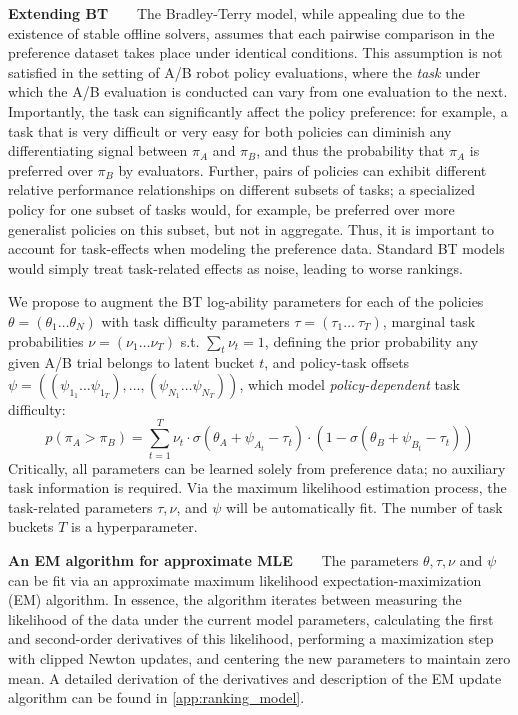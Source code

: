 \textbf{Extending BT~~~} The Bradley-Terry model, while appealing due to the existence of stable offline solvers, assumes that each pairwise comparison in the preference dataset takes place under identical conditions. This assumption is not satisfied in the setting of A/B robot policy evaluations, where the \emph{task} under which the A/B evaluation is conducted can vary from one evaluation to the next. Importantly, the task can significantly affect the policy preference: for example, a task that is very difficult or very easy for both policies can diminish any differentiating signal between $\pi_A$ and $\pi_B$, and thus the probability that $\pi_A$ is preferred over $\pi_B$ by evaluators. 
Further, pairs of policies can exhibit different relative performance relationships on different subsets of tasks; a specialized policy for one subset of tasks would, for example, be preferred over more generalist policies on this subset, but not in aggregate. Thus, it is important to account for task-effects when modeling the preference data. Standard BT models would simply treat task-related effects as noise, leading to worse rankings.

We propose to augment the BT log-ability parameters for each of the policies $\theta = (\theta_1 \dots \theta_N)$ with task difficulty parameters $\tau = (\tau_1 \dots\ \tau_T)$, marginal task probabilities $\nu = (\nu_1 \dots \nu_T)$ s.t. $\sum_t \nu_t = 1$, defining the prior probability any given A/B trial belongs to latent bucket $t$,
and policy-task offsets $\psi = ((\psi_{1_1} \dots \psi_{1_T}), \dots, (\psi_{N_1} \dots \psi_{N_T}))$, which model \emph{policy-dependent} task difficulty:
\vspace{-1em}
\begin{equation}
    p(\pi_A > \pi_B) = \sum_{t=1}^{T} \nu_t \cdot \sigma(\theta_A + \psi_{A_t} - \tau_t) \cdot (1 - \sigma(\theta_B + \psi_{B_t} - \tau_t))
\end{equation}
Critically, all parameters can be learned solely from preference data; no auxiliary task information is required. Via the maximum likelihood estimation process, the task-related parameters $\tau, \nu$, and $\psi$ will be automatically fit. The number of task buckets $T$ is a hyperparameter.%

\textbf{An EM algorithm for approximate MLE~~~} The parameters $\theta, \tau, \nu$ and $\psi$ can be fit via an approximate maximum likelihood expectation-maximization (EM) algorithm. In essence, the algorithm iterates between measuring the likelihood of the data under the current model parameters, calculating the first and second-order derivatives of this likelihood, performing a maximization step with clipped Newton updates, and centering the new parameters to maintain zero mean. A detailed derivation of the derivatives and description of the EM update algorithm can be found in \cref{app:ranking_model}. 





